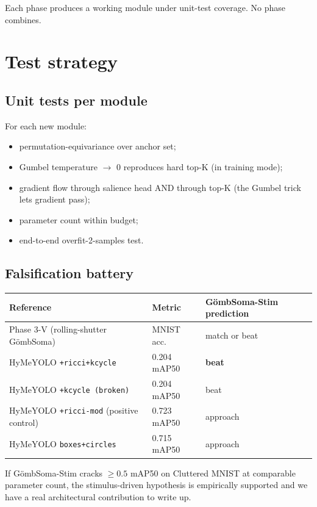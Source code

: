 \documentclass[11pt,a4paper]{article}
\newcommand{\Soma}{G\"ombSoma}
\newcommand{\Stim}{\Soma-Stim}
\begin{document}
Each phase produces a working module under unit-test coverage.
No phase combines.

\section{Test strategy}

\subsection{Unit tests per module}

For each new module:
\begin{itemize}
\item permutation-equivariance over anchor set;
\item Gumbel temperature $\to$ 0 reproduces hard top-K (in training mode);
\item gradient flow through salience head AND through top-K (the
  Gumbel trick lets gradient pass);
\item parameter count within budget;
\item end-to-end overfit-2-samples test.
\end{itemize}

\subsection{Falsification battery}

\begin{center}
\begin{tabular}{lll}
\toprule
Reference                                & Metric        & \Stim{} prediction \\
\midrule
Phase 3-V (rolling-shutter \Soma)        & MNIST acc.    & match or beat \\
HyMeYOLO \texttt{+ricci+kcycle}          & 0.204 mAP50   & \textbf{beat} \\
HyMeYOLO \texttt{+kcycle (broken)}       & 0.204 mAP50   & beat \\
HyMeYOLO \texttt{+ricci-mod} (positive control) & 0.723 mAP50 & approach \\
HyMeYOLO \texttt{boxes+circles}          & 0.715 mAP50   & approach \\
\bottomrule
\end{tabular}
\end{center}

If \Stim{} cracks $\geq 0.5$ mAP50 on Cluttered MNIST at comparable
parameter count, the stimulus-driven hypothesis is empirically
supported and we have a real architectural contribution to write up.
\end{document}
